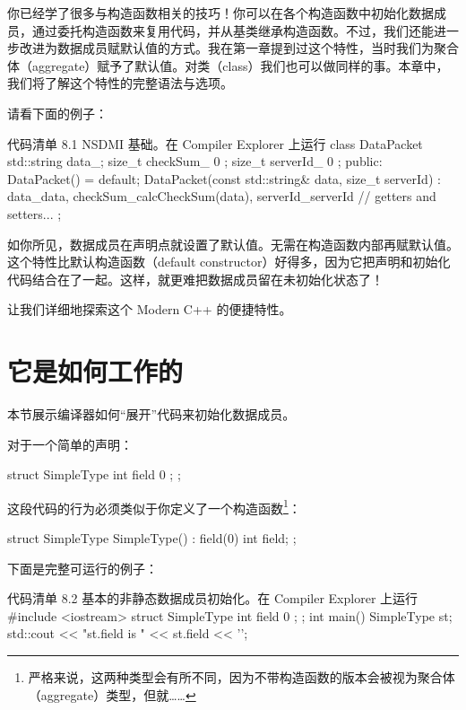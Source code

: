 你已经学了很多与构造函数相关的技巧！你可以在各个构造函数中初始化数据成员，通过委托构造函数来复用代码，并从基类继承构造函数。不过，我们还能进一步改进为数据成员赋默认值的方式。我在第一章提到过这个特性，当时我们为聚合体（aggregate）赋予了默认值。对类（class）我们也可以做同样的事。本章中，我们将了解这个特性的完整语法与选项。

请看下面的例子：

\begin{codeboxt}[cpp]{代码清单 8.1 NSDMI 基础。在 Compiler Explorer 上运行}
class DataPacket {
    std::string data_;
    size_t checkSum_ { 0 };
    size_t serverId_ { 0 };
public:
    DataPacket() = default;
    DataPacket(const std::string& data, size_t serverId)
    : data_{data}, checkSum_{calcCheckSum(data)}, serverId_{serverId}
    { }
    // getters and setters...
};
\end{codeboxt}

如你所见，数据成员在声明点就设置了默认值。无需在构造函数内部再赋默认值。这个特性比默认构造函数（default constructor）好得多，因为它把声明和初始化代码结合在了一起。这样，就更难把数据成员留在未初始化状态了！

让我们详细地探索这个 Modern C++ 的便捷特性。

\section{它是如何工作的}

本节展示编译器如何“展开”代码来初始化数据成员。

对于一个简单的声明：

\begin{codebox}[cpp]
struct SimpleType {
    int field { 0 };
};
\end{codebox}

这段代码的行为必须类似于你定义了一个构造函数\footnote{严格来说，这两种类型会有所不同，因为不带构造函数的版本会被视为聚合体（aggregate）类型，但就……}：

\begin{codebox}[cpp]
struct SimpleType {
    SimpleType() : field(0) { }
    int field;
};
\end{codebox}

下面是完整可运行的例子：

\begin{codeboxt}[cpp]{代码清单 8.2 基本的非静态数据成员初始化。在 Compiler Explorer 上运行}
#include <iostream>
struct SimpleType {
    int field { 0 };
};
int main() {
    SimpleType st;
    std::cout << "st.field is " << st.field << '\n';
}
\end{codeboxt}

